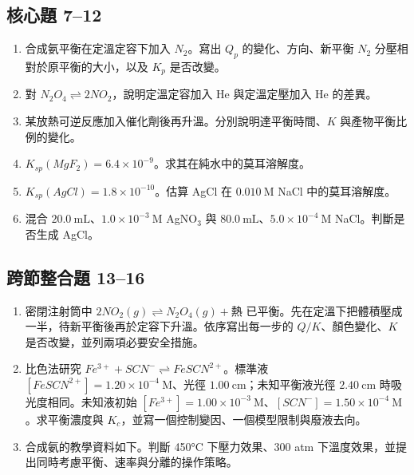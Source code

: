 \documentclass[11pt,a4paper]{article}
\providecommand{\tightlist}{%
  \setlength{\itemsep}{0pt}\setlength{\parskip}{0pt}}
\begin{document}
\subsection{核心題 7--12}\label{ux6838ux5fc3ux984c-712}

\begin{enumerate}
\def\labelenumi{\arabic{enumi}.}
\setcounter{enumi}{6}
\tightlist
\item
  合成氨平衡在定溫定容下加入 \(N_2\)。寫出 \(Q_p\) 的變化、方向、新平衡 \(N_2\) 分壓相對於原平衡的大小，以及 \(K_p\) 是否改變。
\item
  對 \(N_2O_4\rightleftharpoons2NO_2\)，說明定溫定容加入 He 與定溫定壓加入 He 的差異。
\item
  某放熱可逆反應加入催化劑後再升溫。分別說明達平衡時間、\(K\) 與產物平衡比例的變化。
\item
  \(K_{sp}(MgF_2)=6.4\times10^{-9}\)。求其在純水中的莫耳溶解度。
\item
  \(K_{sp}(AgCl)=1.8\times10^{-10}\)。估算 AgCl 在 \(0.010\ \mathrm M\) NaCl 中的莫耳溶解度。
\item
  混合 \(20.0\ \mathrm{mL}\)、\(1.0\times10^{-3}\ \mathrm M\) AgNO\(_3\) 與 \(80.0\ \mathrm{mL}\)、\(5.0\times10^{-4}\ \mathrm M\) NaCl。判斷是否生成 AgCl。
\end{enumerate}

\subsection{跨節整合題 13--16}\label{ux8de8ux7bc0ux6574ux5408ux984c-1316}

\begin{enumerate}
\def\labelenumi{\arabic{enumi}.}
\setcounter{enumi}{12}
\tightlist
\item
  密閉注射筒中 \(2NO_2(g)\rightleftharpoons N_2O_4(g)+\text{熱}\) 已平衡。先在定溫下把體積壓成一半，待新平衡後再於定容下升溫。依序寫出每一步的 \(Q/K\)、顏色變化、\(K\) 是否改變，並列兩項必要安全措施。
\item
  比色法研究 \(Fe^{3+}+SCN^-\rightleftharpoons FeSCN^{2+}\)。標準液 \([FeSCN^{2+}]=1.20\times10^{-4}\ \mathrm M\)、光徑 \(1.00\ \mathrm{cm}\)；未知平衡液光徑 \(2.40\ \mathrm{cm}\) 時吸光度相同。未知液初始 \([Fe^{3+}]=1.00\times10^{-3}\ \mathrm M\)、\([SCN^-]=1.50\times10^{-4}\ \mathrm M\)。求平衡濃度與 \(K_c\)，並寫一個控制變因、一個模型限制與廢液去向。
\item
  合成氨的教學資料如下。判斷 450°C 下壓力效果、300 atm 下溫度效果，並提出同時考慮平衡、速率與分離的操作策略。
\end{enumerate}
\end{document}
